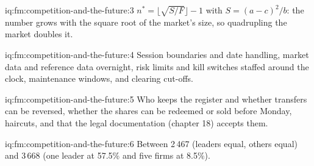 \begin{solution}{iq:fm:competition-and-the-future:3}
$n^*=\lfloor\sqrt{S/F}\rfloor-1$ with $S=(a-c)^2/b$: the number grows with the square root of the market's size, so quadrupling the market doubles
it.
\end{solution}

\begin{solution}{iq:fm:competition-and-the-future:4}
Session boundaries and date handling, market data and reference data overnight, risk limits and kill switches staffed around the clock,
maintenance windows, and clearing cut-offs.
\end{solution}

\begin{solution}{iq:fm:competition-and-the-future:5}
Who keeps the register and whether transfers can be reversed, whether the shares can be redeemed or sold before Monday, haircuts, and that the
legal documentation (chapter 18) accepts them.
\end{solution}

\begin{solution}{iq:fm:competition-and-the-future:6}
Between 2\,467 (leaders equal, others equal) and 3\,668 (one leader at 57.5\% and five firms at 8.5\%).
\end{solution}
